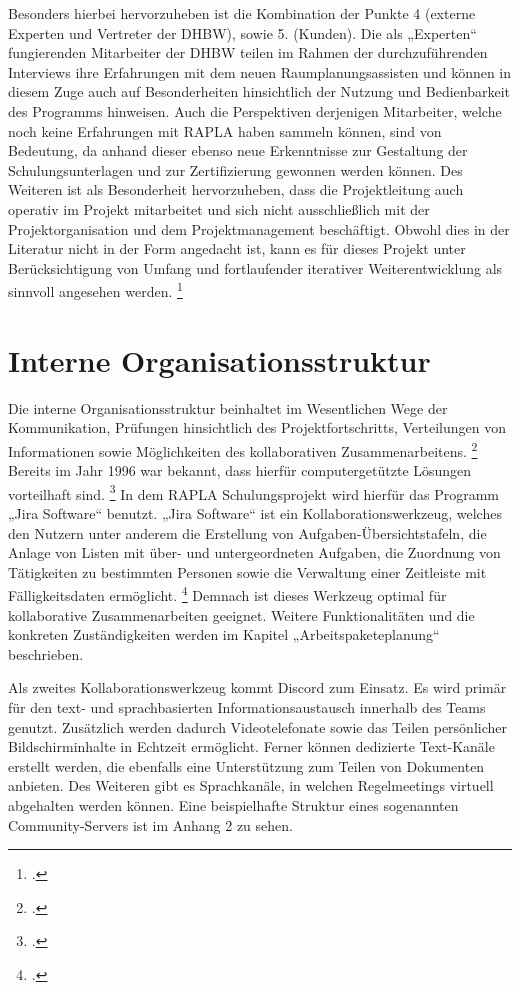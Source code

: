 Besonders hierbei hervorzuheben ist die Kombination der Punkte 4 (externe Experten und Vertreter der DHBW),
sowie 5. (Kunden). Die als „Experten“ fungierenden Mitarbeiter der DHBW teilen im Rahmen der durchzuführenden Interviews ihre Erfahrungen
mit dem neuen Raumplanungsassisten und können in diesem Zuge auch auf Besonderheiten hinsichtlich der Nutzung und Bedienbarkeit des Programms
hinweisen.
Auch die Perspektiven derjenigen Mitarbeiter,
welche noch keine Erfahrungen mit RAPLA haben sammeln können, sind von Bedeutung,
da anhand dieser ebenso neue Erkenntnisse zur Gestaltung der Schulungsunterlagen und
zur Zertifizierung gewonnen werden können. Des Weiteren ist als Besonderheit hervorzuheben,
dass die Projektleitung auch operativ im Projekt mitarbeitet und
sich nicht ausschließlich mit der Projektorganisation und dem Projektmanagement beschäftigt. Obwohl dies in der Literatur nicht in der Form
angedacht ist, kann es für dieses Projekt unter Berücksichtigung von Umfang und fortlaufender iterativer Weiterentwicklung
als sinnvoll angesehen werden.
\footcite[Vgl.][89]{stoegerWirksamesProjektmanagementMit2019}

\section{Interne Organisationsstruktur}
Die interne Organisationsstruktur beinhaltet im Wesentlichen Wege der Kommunikation, Prüfungen hinsichtlich des Projektfortschritts,
Verteilungen von Informationen sowie Möglichkeiten des kollaborativen Zusammenarbeitens.
\footcite[Vgl.][460]{chenOrganizationalStructureDynamics2015}
Bereits im Jahr 1996 war bekannt, dass hierfür computergetützte Lösungen vorteilhaft sind.
\footcite[Vgl.][39]{easonDivisionLabourDesign1996}
In dem RAPLA Schulungsprojekt wird hierfür das Programm „Jira Software“ benutzt.
„Jira Software“ ist ein Kollaborationswerkzeug, welches den Nutzern unter anderem die Erstellung von Aufgaben-Übersichtstafeln,
die Anlage von Listen mit über- und untergeordneten Aufgaben, die Zuordnung von Tätigkeiten zu bestimmten Personen
sowie die Verwaltung einer Zeitleiste mit Fälligkeitsdaten ermöglicht.
\footcites[Vgl.][1]{filionUsingAtlassianTools2017}[][87]{rehaPROJECTMANAGEMENTTOOLS2021}[][S. 32 ff.]{bradComparativeStudyAgile}
Demnach ist dieses Werkzeug optimal für kollaborative Zusammenarbeiten geeignet. Weitere 
Funktionalitäten und die konkreten Zuständigkeiten werden im Kapitel 
„Arbeitspaketeplanung“ beschrieben. 

Als zweites Kollaborationswerkzeug kommt Discord zum Einsatz. Es wird primär für den text- und sprachbasierten Informationsaustausch
innerhalb des Teams genutzt. Zusätzlich werden dadurch
Videotelefonate sowie das Teilen persönlicher Bildschirminhalte in Echtzeit ermöglicht.
Ferner können dedizierte Text-Kanäle erstellt werden, die ebenfalls eine Unterstützung zum Teilen von Dokumenten anbieten.
Des Weiteren gibt es Sprachkanäle, in welchen Regelmeetings virtuell abgehalten werden können. Eine beispielhafte Struktur eines sogenannten Community-Servers ist im Anhang 2 zu sehen.

